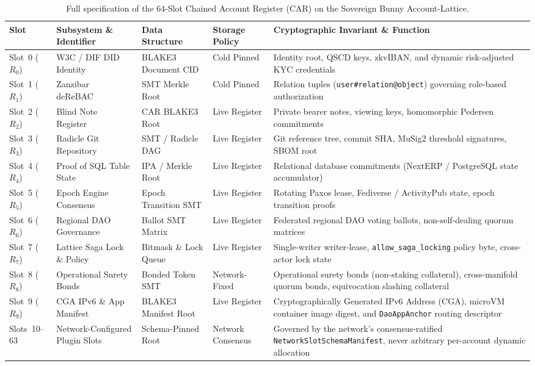 \documentclass[a4paper,11pt,twoside,parskip=half-,headings=small]{scrartcl}
\newcommand{\code}[1]{\texttt{#1}}
\begin{document}
\begin{table}[htbp]
\centering\scriptsize
\renewcommand{\arraystretch}{1.25}
\begin{tabularx}{\linewidth}{@{}l L{2.6cm} L{2.2cm} L{1.8cm} Y@{}}
\toprule
\textbf{Slot} & \textbf{Subsystem \& Identifier} & \textbf{Data Structure} & \textbf{Storage Policy} & \textbf{Cryptographic Invariant \& Function}\\
\midrule
Slot~0 ($R_0$) & W3C / DIF DID Identity~\cite{w3cdid2022,dif2021did} & BLAKE3 Document CID & Cold Pinned & Identity root, QSCD keys, zkvIBAN, and dynamic risk-adjusted KYC credentials\\
Slot~1 ($R_1$) & Zanzibar deReBAC~\cite{pang2019zanzibar} & SMT Merkle Root & Cold Pinned & Relation tuples (\code{user\#relation@object}) governing role-based authorization\\
Slot~2 ($R_2$) & Blind Note Register~\cite{williamson2022aztec,pedersen1991commitment} & CAR BLAKE3 Root & Live Register & Private bearer notes, viewing keys, homomorphic Pedersen commitments\\
Slot~3 ($R_3$) & Radicle Git Repository & SMT / Radicle DAG & Live Register & Git reference tree, commit SHA, MuSig2 threshold signatures, SBOM root\\
Slot~4 ($R_4$) & Proof of SQL Table State & IPA / Merkle Root & Live Register & Relational database commitments (NextERP / PostgreSQL state accumulator)\\
Slot~5 ($R_5$) & Epoch Engine Consensus & Epoch Transition SMT & Live Register & Rotating Paxos lease, Fediverse / ActivityPub state, epoch transition proofs\\
Slot~6 ($R_6$) & Regional DAO Governance & Ballot SMT Matrix & Live Register & Federated regional DAO voting ballots, non-self-dealing quorum matrices\\
Slot~7 ($R_7$) & Lattice Saga Lock \& Policy & Bitmask \& Lock Queue & Live Register & Single-writer writer-lease, \code{allow\_saga\_locking} policy byte, cross-actor lock state\\
Slot~8 ($R_8$) & Operational Surety Bonds & Bonded Token SMT & Network-Fixed & Operational surety bonds (non-staking collateral), cross-manifold quorum bonds, equivocation slashing collateral\\
Slot~9 ($R_9$) & CGA IPv6 \& App Manifest & BLAKE3 Manifest Root & Live Register & Cryptographically Generated IPv6 Address (CGA), microVM container image digest, and \code{DaoAppAnchor} routing descriptor\\
Slots~10--63 & Network-Configured Plugin Slots & Schema-Pinned Root & Network Consensus & Governed by the network's consensus-ratified \code{NetworkSlotSchemaManifest}, never arbitrary per-account dynamic allocation\\
\bottomrule
\end{tabularx}
\caption{Full specification of the 64-Slot Chained Account Register (CAR) on the Sovereign Bunny Account-Lattice.}
\label{tab:slots_spec}
\end{table}
\end{document}
